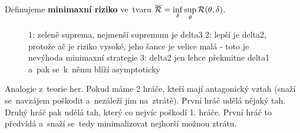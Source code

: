 \begin{define}
	Definujeme \textbf{minimaxní riziko} ve~tvaru $\overline{\mathcal{R}}=\inf\limits_\delta\sup\limits_\theta\mathcal{R}(\theta,\delta)$.
\end{define}

\begin{figure}[h]
	\centering
	\caption{1: zeleně suprema, nejmenší supremum je delta3 2: lepší je delta2, protože ač je riziko vysoké, jeho šance je velice malá - toto je nevýhoda minimaxní strategie 3: delta2 jen lehce překmitne delta1 a~pak se~k~němu blíží asymptoticky}
\end{figure}

\begin{remark}
	Analogie z~teorie her. Pokud máme 2 hráče, kteří mají antagonický vztah (snaží se~navzájem poškodit a~nezáleží jim na~ztrátě). První hráč udělá nějaký tah. Druhý hráč pak udělá tah, který co nejvíc poškodí 1. hráče. První hráč to předvídá a~snaží se~tedy minimalizovat nejhorší možnou ztrátu.
\end{remark}

